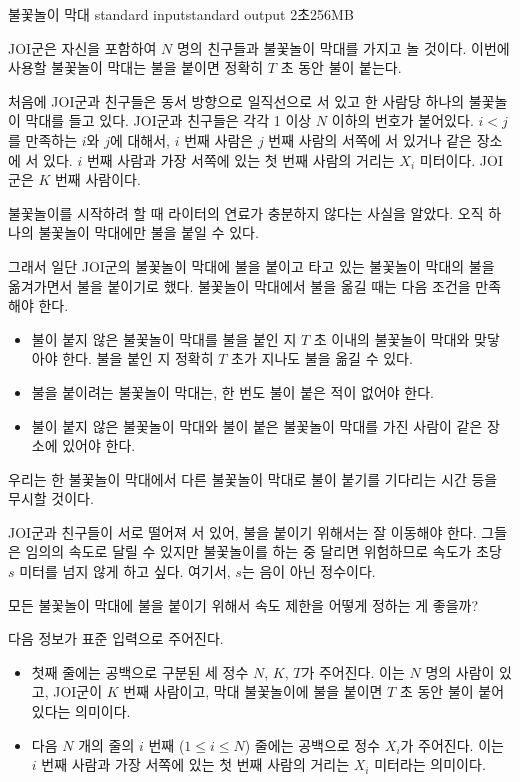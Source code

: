 \begin{problem}{불꽃놀이 막대}
	{standard input}{standard output}
	{2초}{256MB}{}
	
	JOI군은 자신을 포함하여 $N$ 명의 친구들과 불꽃놀이 막대를 가지고 놀 것이다. 이번에 사용할 불꽃놀이 막대는 불을 붙이면 정확히 $T$ 초 동안 불이 붙는다.
	
	처음에 JOI군과 친구들은 동서 방향으로 일직선으로 서 있고 한 사람당 하나의 불꽃놀이 막대를 들고 있다. JOI군과 친구들은 각각 1 이상 $N$ 이하의 번호가 붙어있다. $i<j$를 만족하는 $i$와 $j$에 대해서, $i$ 번째 사람은 $j$ 번째 사람의 서쪽에 서 있거나 같은 장소에 서 있다. $i$ 번째 사람과 가장 서쪽에 있는 첫 번째 사람의 거리는 $X_i$ 미터이다. JOI군은 $K$ 번째 사람이다.
	
	불꽃놀이를 시작하려 할 때 라이터의 연료가 충분하지 않다는 사실을 알았다. 오직 하나의 불꽃놀이 막대에만 불을 붙일 수 있다.
	
	그래서 일단 JOI군의 불꽃놀이 막대에 불을 붙이고 타고 있는 불꽃놀이 막대의 불을 옮겨가면서 불을 붙이기로 했다. 불꽃놀이 막대에서 불을 옮길 때는 다음 조건을 만족해야 한다.
	
	\begin{itemize}
		\item 불이 붙지 않은 불꽃놀이 막대를 불을 붙인 지 $T$ 초 이내의 불꽃놀이 막대와 맞닿아야 한다. 불을 붙인 지 정확히 $T$ 초가 지나도 불을 옮길 수 있다.
		\item 불을 붙이려는 불꽃놀이 막대는, 한 번도 불이 붙은 적이 없어야 한다.
		\item 불이 붙지 않은 불꽃놀이 막대와 불이 붙은 불꽃놀이 막대를 가진 사람이 같은 장소에 있어야 한다.
	\end{itemize}
	
	우리는 한 불꽃놀이 막대에서 다른 불꽃놀이 막대로 불이 붙기를 기다리는 시간 등을 무시할 것이다.
	
	JOI군과 친구들이 서로 떨어져 서 있어, 불을 붙이기 위해서는 잘 이동해야 한다. 그들은 임의의 속도로 달릴 수 있지만 불꽃놀이를 하는 중 달리면 위험하므로 속도가 초당 $s$ 미터를 넘지 않게 하고 싶다. 여기서, $s$는 음이 아닌 정수이다.
	
	모든 불꽃놀이 막대에 불을 붙이기 위해서 속도 제한을 어떻게 정하는 게 좋을까?
	
	\InputFile
	
	다음 정보가 표준 입력으로 주어진다.
	
	\begin{itemize}
		\item 첫째 줄에는 공백으로 구분된 세 정수 $N$, $K$, $T$가 주어진다. 이는 $N$ 명의 사람이 있고, JOI군이 $K$ 번째 사람이고, 막대 불꽃놀이에 불을 붙이면 $T$ 초 동안 불이 붙어있다는 의미이다.
		\item 다음 $N$ 개의 줄의 $i$ 번째 ($1 \le i \le N$) 줄에는 공백으로 정수 $X_i$가 주어진다. 이는 $i$ 번째 사람과 가장 서쪽에 있는 첫 번째 사람의 거리는 $X_i$ 미터라는 의미이다.
	\end{itemize}
	

\end{problem}
